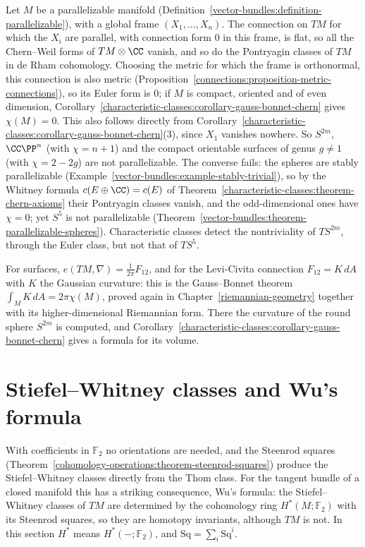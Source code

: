 \begin{example}\label{characteristic-classes:example-parallelizable}
Let $M$ be a parallelizable manifold (Definition~\ref{vector-bundles:definition-parallelizable}), with a global frame $(X_1, \ldots, X_n)$. The connection on $TM$ for which the $X_i$ are parallel, with connection form $0$ in
this frame, is flat, so all the Chern--Weil forms of $TM \otimes \CC$ vanish, and so do the Pontryagin classes of $TM$ in de Rham cohomology. Choosing the metric for which the frame is orthonormal,
this connection is also metric (Proposition~\ref{connections:proposition-metric-connections}), so its Euler form is $0$; if $M$ is compact, oriented and of even dimension,
Corollary~\ref{characteristic-classes:corollary-gauss-bonnet-chern} gives $\chi(M) = 0$. This also follows directly from Corollary~\ref{characteristic-classes:corollary-gauss-bonnet-chern}(3), since $X_1$ vanishes
nowhere. So $S^{2m}$, $\CC\PP^n$ (with $\chi = n + 1$) and the compact orientable surfaces of genus $g \neq 1$ (with $\chi = 2 - 2g$) are not parallelizable. The converse fails: the spheres are stably
parallelizable (Example~\ref{vector-bundles:example-stably-trivial}), so by the Whitney formula $c(E \oplus \CC) = c(E)$ of Theorem~\ref{characteristic-classes:theorem-chern-axioms} their Pontryagin classes
vanish, and the odd-dimensional ones have $\chi = 0$; yet $S^5$ is not parallelizable (Theorem~\ref{vector-bundles:theorem-parallelizable-spheres}). Characteristic classes detect the nontriviality of $TS^{2m}$,
through the Euler class, but not that of $TS^5$.
\end{example}

For surfaces, $e(TM, \nabla) = \frac{1}{2\pi}F_{12}$, and for the Levi-Civita connection $F_{12} = K\,dA$ with $K$ the Gaussian curvature: this is the Gauss--Bonnet theorem
$\int_MK\,dA = 2\pi\chi(M)$, proved again in Chapter~\ref{riemannian-geometry} together with its higher-dimensional Riemannian form. There the curvature of the round sphere $S^{2m}$ is
computed, and Corollary~\ref{characteristic-classes:corollary-gauss-bonnet-chern} gives a formula for its volume.

\section{Stiefel--Whitney classes and Wu's formula}\label{characteristic-classes:section-wu}

With coefficients in $\mathbb{F}_2$ no orientations are needed, and the Steenrod squares
(Theorem~\ref{cohomology-operations:theorem-steenrod-squares}) produce the Stiefel--Whitney classes directly from the Thom class. For the tangent
bundle of a closed manifold this has a striking consequence, Wu's formula: the Stiefel--Whitney classes of $TM$ are determined by the cohomology
ring $H^*(M; \mathbb{F}_2)$ with its Steenrod squares, so they are homotopy invariants, although $TM$ is not. In this section $H^*$ means
$H^*(-; \mathbb{F}_2)$, and $\mathrm{Sq} = \sum_i\mathrm{Sq}^i$.

